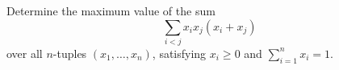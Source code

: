 Determine the maximum value of the sum
\[ \sum_{i<j} x_i x_j (x_i + x_j) \]
over all $n$-tuples $(x_1, \ldots, x_n)$, satisfying $x_i \geq 0$ and $\sum_{i=1}^{n} x_i = 1$.
